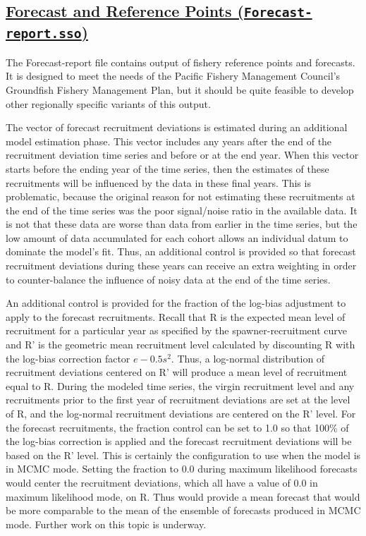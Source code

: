 \hypertarget{ForecastRefPoints}{}
\subsection[Forecast and Reference Points (\texttt{Forecast-report.sso})]{\protect\hyperlink{ForecastRefPoints}{Forecast and Reference Points (\texttt{Forecast-report.sso})}}
The Forecast-report file contains output of fishery reference points and forecasts. It is designed to meet the needs of the Pacific Fishery Management Council's Groundfish Fishery Management Plan, but it should be quite feasible to develop other regionally specific variants of this output.

The vector of forecast recruitment deviations is estimated during an additional model estimation phase. This vector includes any years after the end of the recruitment deviation time series and before or at the end year. When this vector starts before the ending year of the time series, then the estimates of these recruitments will be influenced by the data in these final years. This is problematic, because the original reason for not estimating these recruitments at the end of the time series was the poor signal/noise ratio in the available data. It is not that these data are worse than data from earlier in the time series, but the low amount of data accumulated for each cohort allows an individual datum to dominate the model's fit. Thus, an additional control is provided so that forecast recruitment deviations during these years can receive an extra weighting in order to counter-balance the influence of noisy data at the end of the time series.

An additional control is provided for the fraction of the log-bias adjustment to apply to the forecast recruitments. Recall that R is the expected mean level of recruitment for a particular year as specified by the spawner-recruitment curve and R' is the geometric mean recruitment level calculated by discounting R with the log-bias correction factor $e-0.5s^2$. Thus, a log-normal distribution of recruitment deviations centered on R' will produce a mean level of recruitment equal to R. During the modeled time series, the virgin recruitment level and any recruitments prior to the first year of recruitment deviations are set at the level of R, and the log-normal recruitment deviations are centered on the R' level. For the forecast recruitments, the fraction control can be set to 1.0 so that 100\% of the log-bias correction is applied and the forecast recruitment deviations will be based on the R' level. This is certainly the configuration to use when the model is in MCMC mode. Setting the fraction to 0.0 during maximum likelihood forecasts would center the recruitment deviations, which all have a value of 0.0 in maximum likelihood mode, on R. Thus would provide a mean forecast that would be more comparable to the mean of the ensemble of forecasts produced in MCMC mode.  Further work on this topic is underway.

